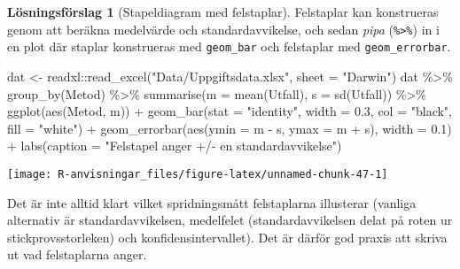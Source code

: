 \documentclass[
]{book}
\newenvironment{Shaded}{\begin{snugshade}}{\end{snugshade}}
\newcommand{\AttributeTok}[1]{\textcolor[rgb]{0.77,0.63,0.00}{#1}}
\newcommand{\FloatTok}[1]{\textcolor[rgb]{0.00,0.00,0.81}{#1}}
\newcommand{\FunctionTok}[1]{\textcolor[rgb]{0.00,0.00,0.00}{#1}}
\newcommand{\NormalTok}[1]{#1}
\newcommand{\OtherTok}[1]{\textcolor[rgb]{0.56,0.35,0.01}{#1}}
\newcommand{\SpecialCharTok}[1]{\textcolor[rgb]{0.00,0.00,0.00}{#1}}
\newcommand{\StringTok}[1]{\textcolor[rgb]{0.31,0.60,0.02}{#1}}
\theoremstyle{definition}
\theoremstyle{definition}
\theoremstyle{definition}
\theoremstyle{definition}
\newtheorem{hypothesis}{Lösningsförslag}[chapter]
\theoremstyle{remark}
\begin{document}
\begin{hypothesis}[Stapeldiagram med felstaplar]
Felstaplar kan konstrueras genom att beräkna medelvärde och standardavvikelse, och sedan \emph{pipa} (\texttt{\%\textgreater{}\%}) in i en plot där staplar konstrueras med \texttt{geom\_bar} och felstaplar med \texttt{geom\_errorbar}.

\begin{Shaded}
\begin{Highlighting}[]
\NormalTok{dat }\OtherTok{\textless{}{-}}\NormalTok{ readxl}\SpecialCharTok{::}\FunctionTok{read\_excel}\NormalTok{(}\StringTok{"Data/Uppgiftsdata.xlsx"}\NormalTok{, }\AttributeTok{sheet =} \StringTok{"Darwin"}\NormalTok{)}
\NormalTok{dat }\SpecialCharTok{\%\textgreater{}\%} 
  \FunctionTok{group\_by}\NormalTok{(Metod) }\SpecialCharTok{\%\textgreater{}\%} 
  \FunctionTok{summarise}\NormalTok{(}\AttributeTok{m =} \FunctionTok{mean}\NormalTok{(Utfall), }\AttributeTok{s =} \FunctionTok{sd}\NormalTok{(Utfall)) }\SpecialCharTok{\%\textgreater{}\%} 
  \FunctionTok{ggplot}\NormalTok{(}\FunctionTok{aes}\NormalTok{(Metod, m)) }\SpecialCharTok{+}
  \FunctionTok{geom\_bar}\NormalTok{(}\AttributeTok{stat =} \StringTok{"identity"}\NormalTok{, }\AttributeTok{width =} \FloatTok{0.3}\NormalTok{, }\AttributeTok{col =} \StringTok{"black"}\NormalTok{, }\AttributeTok{fill =} \StringTok{"white"}\NormalTok{) }\SpecialCharTok{+}
  \FunctionTok{geom\_errorbar}\NormalTok{(}\FunctionTok{aes}\NormalTok{(}\AttributeTok{ymin =}\NormalTok{ m }\SpecialCharTok{{-}}\NormalTok{ s, }\AttributeTok{ymax =}\NormalTok{ m }\SpecialCharTok{+}\NormalTok{ s), }\AttributeTok{width =} \FloatTok{0.1}\NormalTok{) }\SpecialCharTok{+}
  \FunctionTok{labs}\NormalTok{(}\AttributeTok{caption =} \StringTok{"Felstapel anger +/{-} en standardavvikelse"}\NormalTok{)}
\end{Highlighting}
\end{Shaded}

\begin{center}\texttt{[image: R-anvisningar\_files/figure-latex/unnamed-chunk-47-1]} \end{center}

Det är inte alltid klart vilket spridningsmått felstaplarna illusterar (vanliga alternativ är standardavvikelsen, medelfelet (standardavvikelsen delat på roten ur stickprovsstorleken) och konfidensintervallet). Det är därför god praxis att skriva ut vad felstaplarna anger.
\end{hypothesis}
\end{document}
